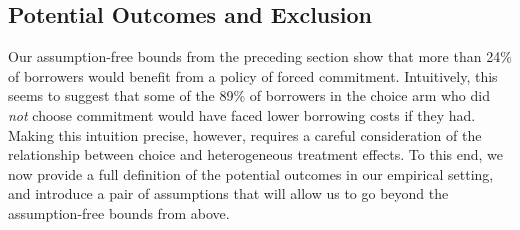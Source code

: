 \documentclass[oneside,11pt]{article}
\begin{document}


\subsection{Potential Outcomes and Exclusion}
\label{sec:potentialOutcomes}

Our assumption-free bounds from the preceding section show that more than 24\% of borrowers would benefit from a policy of forced commitment. 
Intuitively, this seems to suggest that some of the 89\% of borrowers in the choice arm who did \emph{not} choose commitment would have faced lower borrowing costs if they had.
Making this intuition precise, however, requires a careful consideration of the relationship between choice and heterogeneous treatment effects. 
To this end, we now provide a full definition of the potential outcomes in our empirical setting, and introduce a pair of assumptions that will allow us to go beyond the assumption-free bounds from above.
\end{document}
